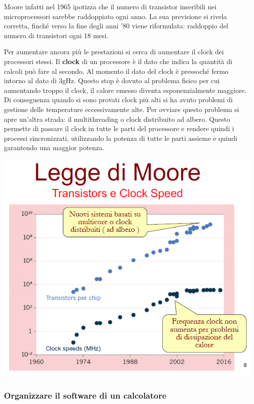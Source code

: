 \documentclass[
  paper=a4,
  oneside  ,captions=tableheading
]{scrbook}
\begin{document}
Moore infatti nel 1965 ipotizza che il numero di transistor inseribili
nei microprocessori sarebbe raddoppiato ogni anno. La sua previsione si
rivela corretta, finché verso la fine degli anni '80 viene riformulata:
raddoppio del numero di transistori ogni 18 mesi.

Per aumentare ancora più le prestazioni si cerca di aumentare il clock
dei processori stessi. Il \textbf{clock} di un processore è il dato che
indica la quantità di calcoli può fare al secondo. Al momento il dato
del clock è pressoché fermo intorno al dato di 3gHz. Questo stop è
dovuto al problema fisico per cui aumentando troppo il clock, il calore
emesso diventa esponenzialmente maggiore. Di conseguenza quando si sono
provati clock più alti si ha avuto problemi di gestione delle
temperature eccessivamente alte. Per ovviare questo problema si apre
un'altra strada: il multithreading o clock distribuito ad albero. Questo
permette di passare il clock in tutte le parti del processore e rendere
quindi i processi sincronizzati, utilizzando la potenza di tutte le
parti assieme e quindi garantendo una maggior potenza.

\includegraphics{./image/image-20201111171947392.png}

\hypertarget{organizzare-il-software-di-un-calcolatore}{%
\subsubsection{Organizzare il software di un
calcolatore}\label{organizzare-il-software-di-un-calcolatore}}
\end{document}
